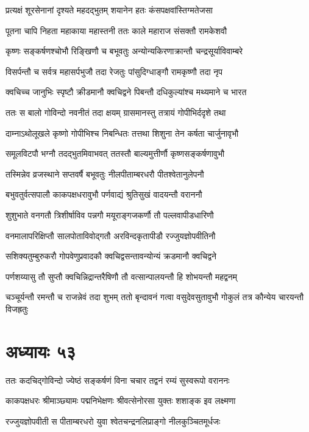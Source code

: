 \twolineshloka
{प्रत्यक्षं शूरसेनानां दृश्यते महदद्भुतम्}
{शयानेन हतः कंसपक्षवांस्तिग्मतेजसा}


\twolineshloka
{पूतना चापि निहता महाकाया महास्तनी}
{ततः काले महाराज संसक्तौ रामकेशवौ}


\twolineshloka
{कृष्णः सङ्कर्षणश्चोभौ रिङ्खिणौ च बभूवतुः}
{अन्योन्यकिरणाक्रान्तौ चन्द्रसूर्याविवाम्बरे}


\twolineshloka
{विसर्पन्तौ च सर्वत्र महासर्पभुजौ तदा}
{रेजतुः पांसुदिग्धाङ्गौ रामकृष्णौ तदा नृप}


\twolineshloka
{क्वचिच्च जानुभिः स्पृष्टौ क्रीडमानौ क्वचिद्वने}
{पिबन्तौ दधिकुल्यांश्च मथ्यमाने च भारत}


\twolineshloka
{ततः स बालो गोविन्दो नवनीतं तदा क्षयम्}
{ग्रासमानस्तु तत्रायं गोपीभिर्ददृशे तथा}


\twolineshloka
{दाम्नाऽथोलूखले कृष्णो गोपीभिश्च निबन्धितः}
{तत्तथा शिशुना तेन कर्षता चार्जुनावृभौ}


\twolineshloka
{समूलविटपौ भग्नौ तदद्भुतमिवाभवत्}
{ततस्तौ बाल्यमुत्तीर्णौ कृष्णसङ्कर्षणावुभौ}


\twolineshloka
{तस्मिन्नेव व्रजस्थाने सप्तवर्षै बभूवतुः}
{नीलपीताम्बरधरौ पीतश्वेतानुलेपनौ}


\twolineshloka
{बभुवतुर्वत्सपालौ काकपक्षधरावुभौ}
{पर्णवाद्यं श्रुतिसुखं वादयन्तौ वराननौ}


\twolineshloka
{शुशुभाते वनगतौ त्रिशीर्षाविव पन्नगौ}
{मयूराङ्गजकर्णौ तौ पल्लवापीडधारिणौ}


\twolineshloka
{वनमालापरिक्षिप्तौ सालपोताविवोद्गतौ}
{अरविन्दकृतापीडौ रज्जुयज्ञोपवीतिनौ}


\twolineshloka
{सशिक्यतुम्बुरुकरौ गोपवेणुप्रवादकौ}
{क्वचिद्वसन्तावन्योन्यं क्रडमानौ क्वचिद्वने}


\twolineshloka
{पर्णशय्यासु तौ सुप्तौ क्वचिन्निद्रान्तरैषिणौ}
{तौ वत्सान्पालयन्तौ हि शोभयन्तौ महद्वनम्}


\threelineshloka
{चञ्चूर्यन्तौ रमन्तौ च राजन्नेवं तदा शुभम्}
{ततो बृन्दावनं गत्वा वसुदेवसुतावुभौ}
{गोकुलं तत्र कौन्येय चारयन्तौ विजह्रतुः}


\chapter{अध्यायः ५३}
\twolineshloka
{ततः कदचिद्गोविन्दो ज्येष्ठं सङ्कर्षणं विना}
{चचार तद्वनं रम्यं सुस्वरूपो वराननः}


\twolineshloka
{काकपक्षधरः श्रीमाञ्छ्यामः पद्मनिभेक्षणः}
{श्रीवत्सेनोरसा युक्तः शशाङ्क इव लक्ष्मणा}


\twolineshloka
{रज्जुयज्ञोपवीती स पीताम्बरधरो युवा}
{श्वेतचन्द्रनलिप्राङ्गो नीलकुञ्चितमूर्धजः}


